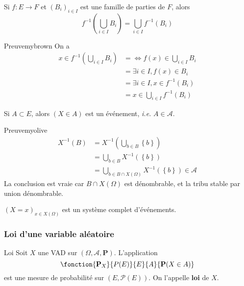     \begin{lem}{}{}
        Si $f : E \to F$ et $(B_i)_{i \in I}$ est une famille de parties de $F$, alors 
        \[ f^{-1} \left(\bigcup_{i \in I} B_i\right) = \bigcup_{i \in I} f^{-1}(B_i) \]   
    \end{lem}

    \begin{demo}{Preuve}{mybrown}
        On a 
        \begin{align*}
            x \in f^{-1}\left(\bigcup_{i \in I} B_i\right) 
            &= \iff f(x) \in \bigcup_{i \in I} B_i \\
            &= \exists i \in I, f(x) \in B_i \\
            &= \exists i \in I, x \in f^{-1}(B_i) \\
            &= x \in \bigcup_{i \in I} f^{-1}(B_i)
        \end{align*}
    \end{demo}

    \begin{prop}{}{}
        Si $A \subset E$, alors $(X \in A)$ est un événement, \textit{i.e.} $A \in \mathcal{A}$.
    \end{prop}

    \begin{demo}{Preuve}{myolive}
        \begin{align*}
            X^{-1}(B) &= X^{-1}\left(\bigcup_{b \in B} \left\{b\right\}\right) \\
            &= \bigcup_{b \in B} X^{-1}(\left\{b\right\}) \\
            &= \bigcup_{b \in B \cap X(\Omega)} X^{-1}(\left\{b\right\}) \in \mathcal{A}
        \end{align*}
        La conclusion est vraie car $B \cap X(\Omega)$ est dénombrable, et la tribu stable par union dénombrable.
    \end{demo}

    \begin{theo}{}{}
        $(X = x)_{x \in X(\Omega)}$ est un système complet d’événements.
    \end{theo}

    \subsubsection{Loi d’une variable aléatoire}

    \begin{defitheo}{Loi}{}
        Soit $X$ une VAD sur $(\Omega, \mathcal{A}, \mathbf{P})$. L’application 
        \[ \fonction{\mathbf{P}_X}{P(E)}{E}{A}{\mathbf{P}(X \in A)} \]   
        est une mesure de probabilité sur $(E, \mathcal{P}(E))$. On l’appelle \textbf{loi} de $X$.
    \end{defitheo}

